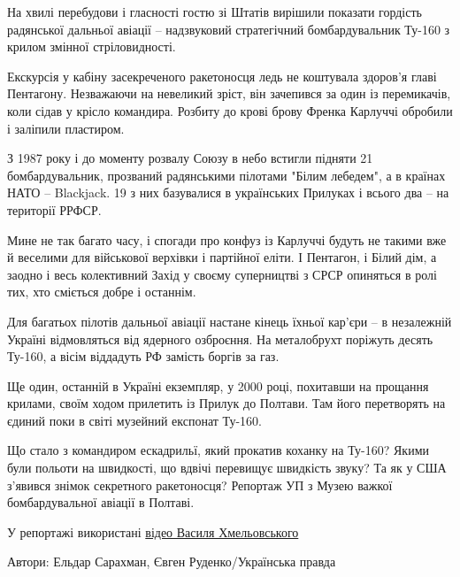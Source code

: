 \begin{itemize}
\begin{multicols}{2}
На хвилі перебудови і гласності гостю зі Штатів вирішили показати гордість
радянської дальньої авіації – надзвуковий стратегічний бомбардувальник Ту-160 з
крилом змінної стріловидності.

Екскурсія у кабіну засекреченого ракетоносця ледь не коштувала здоров'я главі
Пентагону. Незважаючи на невеликий зріст, він зачепився за один із перемикачів,
коли сідав у крісло командира. Розбиту до крові брову Френка Карлуччі обробили
і заліпили пластиром.

З 1987 року і до моменту розвалу Союзу в небо встигли підняти 21
бомбардувальник, прозваний радянськими пілотами "Білим лебедем", а в країнах
НАТО – Blackjack. 19 з них базувалися в українських Прилуках і всього два – на
території РРФСР.

Мине не так багато часу, і спогади про конфуз із Карлуччі будуть не такими вже
й веселими для військової верхівки і партійної еліти. І Пентагон, і Білий дім,
а заодно і весь колективний Захід у своєму суперництві з СРСР опиняться в ролі
тих, хто сміється добре і останнім.

Для багатьох пілотів дальньої авіації настане кінець їхньої кар'єри – в
незалежній Україні відмовляться від ядерного озброєння. На металобрухт поріжуть
десять Ту-160, а вісім віддадуть РФ замість боргів за газ.

Ще один, останній в Україні екземпляр, у 2000 році, похитавши на прощання
крилами, своїм ходом прилетить із Прилук до Полтави. Там його перетворять на
єдиний поки в світі музейний експонат Ту-160.

Що стало з командиром ескадрильї, який прокатив коханку на Ту-160? Якими були
польоти на швидкості, що вдвічі перевищує швидкість звуку? Та як у США з’явився
знімок секретного ракетоносця? Репортаж УП з Музею важкої бомбардувальної
авіації в Полтаві.

У репортажі використані 
\href{https://www.youtube.com/c/ВасилийХмелевский/featured}{%
відео Василя Хмельовського %
}

Автори: Ельдар Сарахман, Євген Руденко/Українська правда

\end{multicols}

\end{itemize} %
